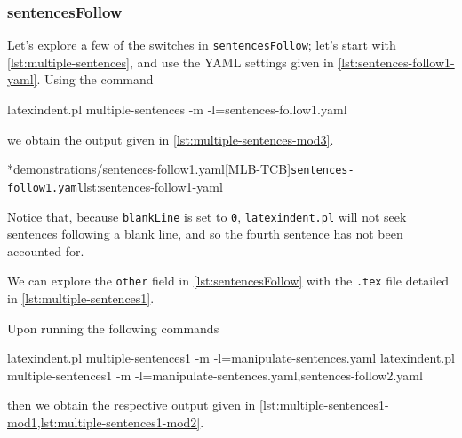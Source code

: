 \subsubsection{sentencesFollow}
	Let's explore a few of the switches in \texttt{sentencesFollow}; let's start with \vref{lst:multiple-sentences}, and use the YAML
	settings given in \cref{lst:sentences-follow1-yaml}. Using the command
	\begin{commandshell}
latexindent.pl multiple-sentences -m -l=sentences-follow1.yaml
\end{commandshell}
	we obtain the output given in \cref{lst:multiple-sentences-mod3}.

	\begin{minipage}{.5\linewidth}
	\end{minipage}
	\hfill
	\begin{minipage}{.5\linewidth}
		\cmhlistingsfromfile[style=yaml-LST]*{demonstrations/sentences-follow1.yaml}[MLB-TCB]{\texttt{sentences-follow1.yaml}}{lst:sentences-follow1-yaml}
	\end{minipage}

	Notice that, because \texttt{blankLine} is set to \texttt{0}, \texttt{latexindent.pl} will not seek sentences following a blank line,
	and so the fourth sentence has not been accounted for.

	We can explore the \texttt{other} field in \cref{lst:sentencesFollow} with the \texttt{.tex} file detailed in \cref{lst:multiple-sentences1}.


	Upon running the following commands
	\begin{widepage}
		\begin{commandshell}
latexindent.pl multiple-sentences1 -m -l=manipulate-sentences.yaml
latexindent.pl multiple-sentences1 -m -l=manipulate-sentences.yaml,sentences-follow2.yaml
	\end{commandshell}
	\end{widepage}
	then we obtain the respective output given in \cref{lst:multiple-sentences1-mod1,lst:multiple-sentences1-mod2}.

